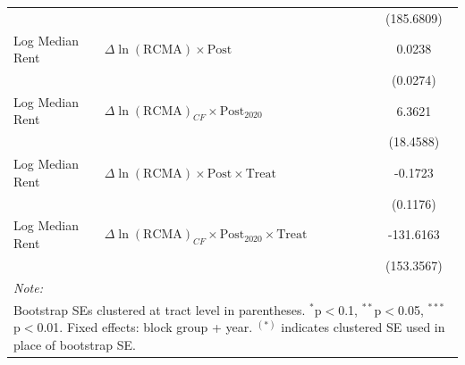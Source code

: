 \begin{table}[!h]
{\begin{tabular}[t]{llc}
 &  & (185.6809)\\
Log Median Rent & $\Delta\ln(\text{RCMA}) \times \text{Post}$ & 0.0238\\
\addlinespace
 &  & (0.0274)\\
Log Median Rent & $\Delta\ln(\text{RCMA})_{CF} \times \text{Post}_{2020}$ & 6.3621\\
 &  & (18.4588)\\
Log Median Rent & $\Delta\ln(\text{RCMA}) \times \text{Post} \times \text{Treat}$ & -0.1723\\
 &  & (0.1176)\\
\addlinespace
Log Median Rent & $\Delta\ln(\text{RCMA})_{CF} \times \text{Post}_{2020} \times \text{Treat}$ & -131.6163\\
 &  & (153.3567)\\
\bottomrule
\multicolumn{3}{l}{\rule{0pt}{1em}\textit{Note: }}\\
\multicolumn{3}{l}{\rule{0pt}{1em}Bootstrap SEs clustered at tract level in parentheses. $^{*}$p$<$0.1, $^{**}$p$<$0.05, $^{***}$p$<$0.01. Fixed effects: block group + year. $^{(*)}$ indicates clustered SE used in place of bootstrap SE.}\\
\end{tabular}}
\end{table}
